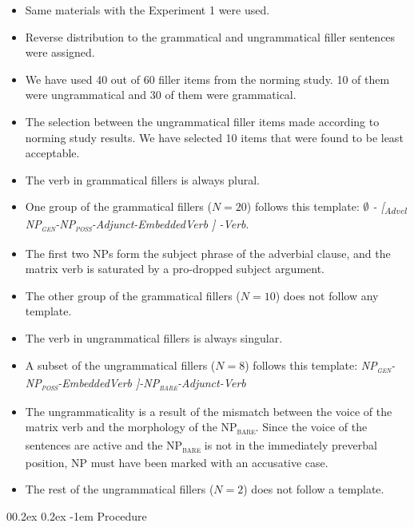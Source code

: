 \documentclass[
  10pt,
  english,
  doc,floatsintext]{apa6}
\makeatletter
\providecommand{\tightlist}{%
  \setlength{\itemsep}{0pt}\setlength{\parskip}{0pt}}
\let\oldparagraph\paragraph
\renewcommand{\paragraph}[1]{\oldparagraph{#1}\mbox{}}
\renewcommand{\paragraph}{\@startsection{paragraph}{4}{\parindent}%
  {0\baselineskip \@plus 0.2ex \@minus 0.2ex}%
  {-1em}%
  {\normalfont\normalsize\bfseries\itshape\typesectitle}}
\makeatother
\begin{document}
\begin{itemize}
\tightlist
\item
  Same materials with the Experiment 1 were used.
\item
  Reverse distribution to the grammatical and ungrammatical filler sentences were assigned.
\item
  We have used 40 out of 60 filler items from the norming study. 10 of them were ungrammatical and 30 of them were grammatical.
\item
  The selection between the ungrammatical filler items made according to norming study results. We have selected 10 items that were found to be least acceptable.
\item
  The verb in grammatical fillers is always plural.
\item
  One group of the grammatical fillers (\(N=20\)) follows this template: \newline \emph{$\emptyset$ - [\textsubscript{Advcl} NP\textsubscript{\textsc{gen}}-NP\textsubscript{\textsc{poss}}-Adjunct-EmbeddedVerb ] -Verb}.
\item
  The first two NPs form the subject phrase of the adverbial clause, and the matrix verb is saturated by a pro-dropped subject argument.
\item
  The other group of the grammatical fillers (\(N=10\)) does not follow any template.
\item
  The verb in ungrammatical fillers is always singular.
\item
  A subset of the ungrammatical fillers (\(N=8\)) follows this template: \newline \emph{NP\textsubscript{\textsc{gen}}-NP\textsubscript{\textsc{poss}}-EmbeddedVerb ]-NP\textsubscript{\textsc{bare}}-Adjunct-Verb}
\item
  The ungrammaticality is a result of the mismatch between the voice of the matrix verb and the morphology of the NP\textsubscript{\textsc{bare}}. Since the voice of the sentences are active and the NP\textsubscript{\textsc{bare}} is not in the immediately preverbal position, NP must have been marked with an accusative case.
\item
  The rest of the ungrammatical fillers (\(N=2\)) does not follow a template.
\end{itemize}

\hypertarget{procedure-1}{%
\paragraph{Procedure}\label{procedure-1}}
\end{document}
